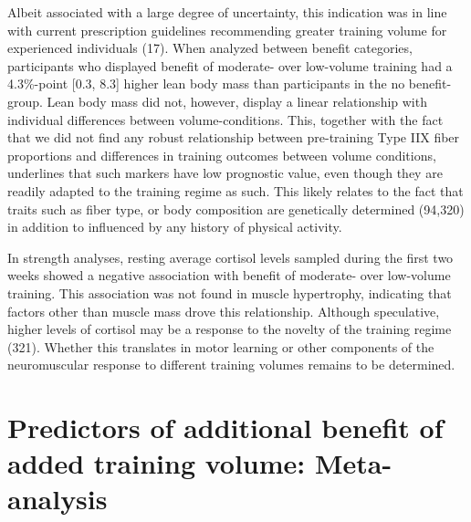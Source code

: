 \documentclass[twoside,10pt]{gihclass} %
\begin{document}
Albeit associated with a large degree of uncertainty, this indication was in line with current prescription guidelines recommending greater training volume for experienced individuals
(17).
When analyzed between benefit categories, participants who displayed benefit of moderate- over low-volume training had a 4.3\%-point {[}0.3, 8.3{]} higher lean body mass than participants in the no benefit-group.
Lean body mass did not, however, display a linear relationship with individual differences between volume-conditions.
This, together with the fact that we did not find any robust relationship between pre-training Type IIX fiber proportions and differences in training outcomes between volume conditions, underlines that such markers have low prognostic value, even though they are readily adapted to the training regime as such.
This likely relates to the fact that traits such as fiber type, or body composition are genetically determined
(94,320)
in addition to influenced by any history of physical activity.

In strength analyses, resting average cortisol levels sampled during the first two weeks showed a negative association with benefit of moderate- over low-volume training. This association was not found in muscle hypertrophy, indicating that factors other than muscle mass drove this relationship. Although speculative, higher levels of cortisol may be a response to the novelty of the training regime
(321).
Whether this translates in motor learning or other components of the neuromuscular response to different training volumes remains to be determined.

\hypertarget{predictors-of-additional-benefit-of-added-training-volume-meta-analysis}{%
\section{Predictors of additional benefit of added training volume: Meta-analysis}\label{predictors-of-additional-benefit-of-added-training-volume-meta-analysis}}
\end{document}
